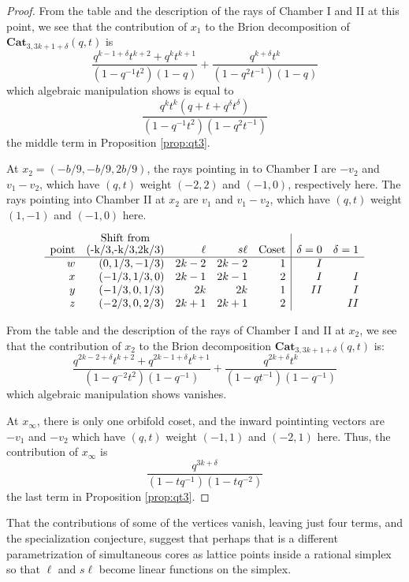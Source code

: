 \documentclass{amsart}[12pt]
\theoremstyle{definition}
\newcommand{\Cat}{\mathbf{Cat}}
\newcommand{\sk}{s\ell}
\begin{document}
\begin{proof}
From the table and the description of the rays of Chamber I and II at this point, we see that the contribution of $x_1$ to the Brion decomposition of $\Cat_{3,3k+1+\delta}(q,t)$ is 
$$\frac{q^{k-1+\delta}t^{k+2}+q^kt^{k+1}}{(1-q^{-1}t^2)(1-q)}+\frac{q^{k+\delta}t^k}{(1-q^2t^{-1})(1-q)}$$
which algebraic manipulation shows is equal to
$$\frac{q^kt^k(q+t+q^\delta t^\delta)}{(1-q^{-1}t^2)(1-q^2t^{-1})}$$
the middle term in Proposition \ref{prop:qt3}.


At $x_2=(-b/9, -b/9, 2b/9)$, the rays pointing in to Chamber I are $-v_2$ and $v_1-v_2$, which have $(q,t)$ weight $(-2, 2)$ and $(-1, 0)$, respectively here.  The rays pointing into Chamber II at $x_2$ are $v_1$ and $v_1-v_2$, which have $(q,t)$ weight $(1,-1)$ and $(-1,0)$ here.

$$
\begin{array}{rrrrr|rr}
\text{point} & \shortstack{ \text{Shift from}\\ (-k/3,-k/3,2k/3)} & \ell & \sk & \text{Coset} & \delta=0  &\delta=1  \\
\hline
w  & (0, 1/3, -1/3) & 2k-2 & 2k-2 & 1 & I & \\
x  & (-1/3, 1/3, 0) & 2k-1 &2k-1 & 2 & I & I \\ 
y & (-1/3, 0, 1/3) & 2k &2k & 1 & II & I \\
z & (-2/3, 0, 2/3) & 2k+1 & 2k+1 & 2 &   & II 
\end{array}
$$

From the table and the description of the rays of Chamber I and II at $x_2$, we see that the contribution of $x_2$ to the Brion decomposition $\Cat_{3, 3k+1+\delta}(q,t)$ is:
$$\frac{q^{2k-2+\delta}t^{k+2}+q^{2k-1+\delta}t^{k+1}}{(1-q^{-2}t^2)(1-q^{-1})}+\frac{q^{2k+\delta}t^k}{(1-qt^{-1})(1-q^{-1})}$$
which algebraic manipulation shows vanishes.


At $x_\infty$, there is only one orbifold coset, and the inward pointinting vectors are $-v_1$ and $-v_2$ which have $(q,t)$ weight $(-1,1)$ and $(-2,1)$ here.  Thus, the contribution of $x_\infty$ is 
$$\frac{q^{3k+\delta}}{(1-tq^{-1})(1-tq^{-2})}$$
the last term in Proposition \ref{prop:qt3}.

\end{proof}

That the contributions of some of the vertices vanish, leaving just four terms, and the specialization conjecture, suggest that perhaps that is a different parametrization of simultaneous cores as lattice points inside a rational simplex so that $\ell$ and $\sk$ become linear functions on the simplex.
\end{document}

